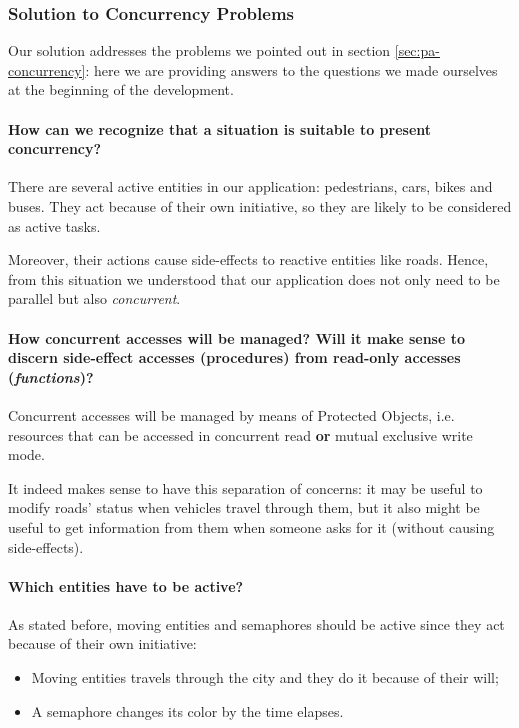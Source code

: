 \subsubsection{Solution to Concurrency Problems}

Our solution addresses the problems we pointed out in section
\ref{sec:pa-concurrency}: here we are providing answers to the questions we
made ourselves at the beginning of the development.

\paragraph{How can we recognize that a situation is suitable to present
concurrency?} There are several active entities in our application: pedestrians,
cars, bikes and buses. They act because of their own initiative, so they are
likely to be considered as active tasks.

Moreover, their actions cause side-effects to reactive entities like roads.
Hence, from this situation we understood that our application does not only
need to be parallel but also \textit{concurrent}.

\paragraph{How concurrent accesses will be managed? Will it make sense to
discern side-effect accesses (procedures) from read-only accesses
(\textit{functions})?} Concurrent accesses will be managed by means of
Protected Objects, i.e. resources that can be accessed in concurrent read
\textbf{or} mutual exclusive write mode.

It indeed makes sense to have this separation of concerns: it may be useful to
modify roads' status when vehicles travel through them, but it also might be
useful to get information from them when someone asks for it (without causing
side-effects).

\paragraph{Which entities have to be active?} As stated before, moving entities
and semaphores should be active since they act because of their own initiative:
\begin{itemize}
  \item Moving entities travels through the city and they do it because of
    their will;
  \item A semaphore changes its color by the time elapses.
\end{itemize}

